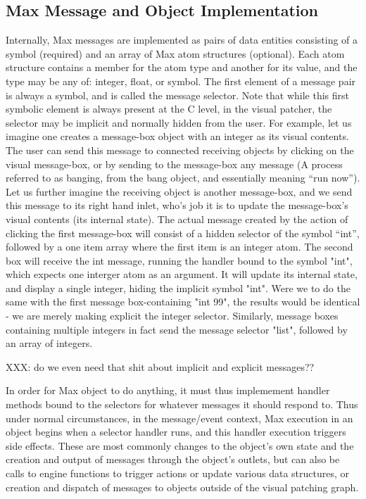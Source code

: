 \documentclass[acmsmall]{acmart}
\begin{document}
\subsection{Max Message and Object Implementation} 
Internally, Max messages are implemented as pairs of data entities consisting of a symbol (required) 
and an array of Max atom structures (optional). Each atom structure contains a member for the 
atom type and another for its value, and the type may be any of: integer, float, or symbol.  
The first element of a message pair is always a symbol, and is called the message selector. 
Note that while this first symbolic element is always present at the C level, in the visual patcher, the
selector may be implicit and normally hidden from the user. 
For example, let us imagine one creates a message-box object with an integer as its visual contents.
The user can send this message to connected receiving objects by clicking on the visual message-box,
or by sending to the message-box any message (A process referred to as banging, from the bang object, 
and essentially meaning “run now”). Let us further imagine the receiving object is another message-box,
and we send this message to its right hand inlet, who's job it is to update the message-box's visual 
contents (its internal state). The actual message created by the action of clicking the first message-box
will consist of a hidden selector of the symbol “int”, followed by a one item array where the first 
item is an integer atom. The second box will receive the int message, running the handler bound to
the symbol "int", which expects one interger atom as an argument. It will update its internal state,
and display a single integer, hiding the implicit symbol "int". Were we to do the same with the first
message box-containing "int 99", the results would be identical - we are merely making explicit the
integer selector. Similarly, message boxes containing multiple integers in fact send the message
selector "list", followed by an array of integers.

XXX: do we even need that shit about implicit and explicit messages??

In order for Max object to do anything, it must thus implemement handler methods bound to the selectors
for whatever messages it should respond to. 
Thus under normal circumstances, in the message/event context, Max execution in an object begins when
a selector handler runs, and this handler execution triggers side effects. These are most commonly
changes to the object's own state and the creation and output of messages through the object's 
outlets, but can also be calls to engine functions to trigger actions or update various
data structures, or creation and dispatch of messages to objects outside of the visual patching graph.
\end{document}
